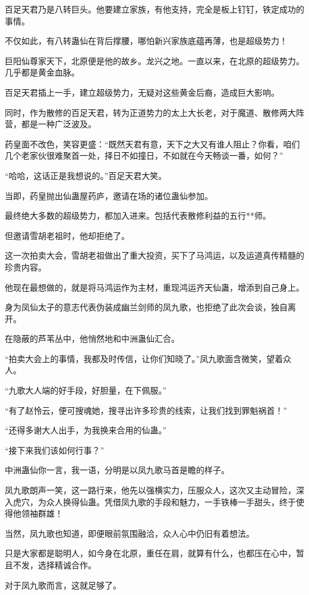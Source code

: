 \begin{this_body}
百足天君乃是八转巨头。他要建立家族，有他支持，完全是板上钉钉，铁定成功的事情。

不仅如此，有八转蛊仙在背后撑腰，哪怕新兴家族底蕴再薄，也是超级势力！

巨阳仙尊家天下，北原便是他的故乡。龙兴之地。一直以来，在北原的超级势力。几乎都是黄金血脉。

百足天君插上一手，建立超级势力，无疑对这些黄金后裔，造成巨大影响。

同时，作为散修的百足天君，转为正道势力的太上大长老，对于魔道、散修两大阵营，都是一种广泛波及。

药皇面不改色，笑容更盛：“既然天君有意，天下之大又有谁人阻止？你看，咱们几个老家伙很难聚首一处，择日不如撞日，不如就在今天畅谈一番，如何？”

“哈哈，这话正是我想说的。”百足天君大笑。

当即，药皇抛出仙蛊屋药庐，邀请在场的诸位蛊仙参加。

最终绝大多数的超级势力，都加入进来。包括代表散修利益的五行**师。

但邀请雪胡老祖时，他却拒绝了。

这一次拍卖大会，雪胡老祖做出了重大投资，买下了马鸿运，以及运道真传精髓的珍贵内容。

他现在最想做的，就是将马鸿运作为主材，重现鸿运齐天仙蛊，增添到自己身上。

身为凤仙太子的意志代表伪装成幽兰剑师的凤九歌，也拒绝了此次会谈，独自离开。

在隐蔽的芦苇丛中，他悄然地和中洲蛊仙汇合。

“拍卖大会上的事情，我都及时传信，让你们知晓了。”凤九歌面含微笑，望着众人。

“九歌大人端的好手段，好胆量，在下佩服。”

“有了赵怜云，便可搜魂她，搜寻出许多珍贵的线索，让我们找到罪魁祸首！”

“还得多谢大人出手，为我换来合用的仙蛊。”

“接下来我们该如何行事？”

中洲蛊仙你一言，我一语，分明是以凤九歌马首是瞻的样子。

凤九歌朗声一笑，这一路行来，他先以强横实力，压服众人，这次又主动冒险，深入虎穴，为众人换得仙蛊。凭借凤九歌的手段和魅力，一手铁棒一手甜头，终于使得他领袖群雄！

当然，凤九歌也知道，即便眼前氛围融洽，众人心中仍旧有着想法。

只是大家都是聪明人，如今身在北原，重任在肩，就算有什么，也都压在心中，暂且不发，选择精诚合作。

对于凤九歌而言，这就足够了。


\end{this_body}
